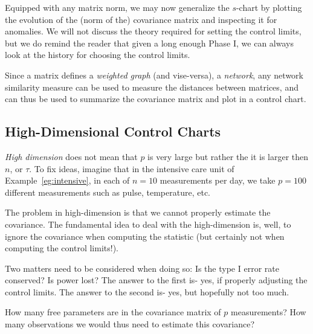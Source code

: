 Equipped with any matrix norm, we may now generalize the $s$-chart by plotting the evolution of the (norm of the) covariance matrix and inspecting it for anomalies. 
We will not discuss the theory required for setting the control limits, but we do remind the reader that given a long enough Phase I, we can always look at the history for choosing the control limits. 



\begin{extra}
Since a matrix defines a \emph{weighted graph} (and vise-versa), \aka a \emph{network}, any network similarity measure can be used to measure the distances between matrices, and can thus be used to summarize the covariance matrix and plot in a control chart.
\end{extra}







\subsection{High-Dimensional Control Charts}

\emph{High dimension} does not mean that $p$ is very large but rather the it is larger then $n$, or $\tau$. 
To fix ideas, imagine that in the intensive care unit of Example~\ref{eg:intensive}, in each of $n=10$ measurements per day, we take $p=100$ different measurements such as pulse, temperature, etc.


The problem in high-dimension is that we cannot properly estimate the covariance. 
The fundamental idea to deal with the high-dimension is, well, to ignore the covariance when computing the statistic (but certainly not when computing the control limits!). 

Two matters need to be considered when doing so:
Is the type I error rate conserved?
Is power lost?
The answer to the first is- yes, if properly adjusting the control limits. 
The answer to the second is- yes, but hopefully not too much.

\begin{think}
How many free parameters are in the covariance matrix of $p$ measurements?
How many observations we would thus need to estimate this covariance?
\end{think} 



